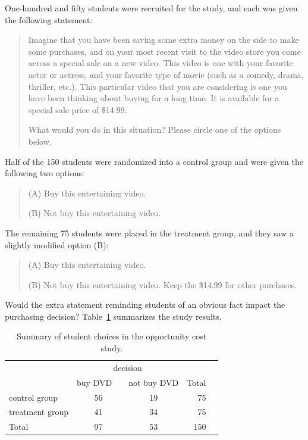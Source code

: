 One-hundred and fifty students were recruited for the study, and each was given the following statement:
\begin{quote}
Imagine that you have been saving some extra money on the side to make some purchases, and on your most recent visit to the video store you come across a special sale on a new video. This video is one with your favorite actor or actress, and your favorite type of movie (such as a comedy, drama, thriller, etc.). This particular video that you are considering is one you have been thinking about buying for a long time. It is available for a special sale price of \$14.99.

What would you do in this situation? Please circle one of the options below.
\end{quote}
Half of the 150 students were randomized into a control group and were given the following two options:
\begin{quote}
(A) Buy this entertaining video.

(B) Not buy this entertaining video.
\end{quote}
The remaining 75 students were placed in the treatment group, and they saw a slightly modified option (B):
\begin{quote}
(A) Buy this entertaining video.

(B) Not buy this entertaining video. Keep the \$14.99 for other purchases.
\end{quote}
Would the extra statement reminding students of an obvious fact impact the purchasing decision? Table~\ref{OpportunityCostTable} summarizes the study results.

\begin{table}[ht]
\centering
\begin{tabular}{l cc rr}
& \multicolumn{2}{c}{decision} \\
\cline{2-3}
				& {buy DVD}\ \  	& {not buy DVD} & Total & \hspace{3mm}  \\ 
\cline{1-4}
control group 		& 56		& 19	& 75 \\ 
treatment group 	& 41		& 34	& 75 \\ 
\cline{1-4}
Total				& 97		& 53	& 150
\end{tabular}
\caption{Summary of student choices in the opportunity cost study.}
\label{OpportunityCostTable}
\end{table}

